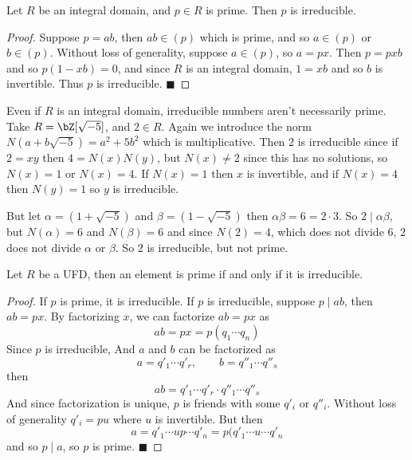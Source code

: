 \documentclass[10pt]{article}
\def\divides{{\mid}}
\def\qed{\hskip1cm\hbox{}\hfill$\blacksquare$}
\begin{document}
\begin{prop*}

    Let $R$ be an integral domain, and $p\in R$ is prime.
    Then $p$ is irreducible.

\end{prop*}

\begin{proof}

    Suppose $p=ab$, then $ab\in(p)$ which is prime, and so $a\in(p)$ or $b\in(p)$.
    Without loss of generality, suppose $a\in(p)$, so $a=px$.
    Then $p=pxb$ and so $p(1-xb)=0$, and since $R$ is an integral domain, $1=xb$ and so $b$ is invertible.
    Thus $p$ is irreducible.
    \qed

\end{proof}

\begin{exam*}

    Even if $R$ is an integral domain, irreducible numbers aren't necessarily prime.
    Take $R=\bZ[\sqrt{-5}]$, and $2\in R$.
    Again we introduce the norm $N(a+b\sqrt{-5})=a^2+5b^2$ which is multiplicative.
    Then $2$ is irreducible since if $2=xy$ then $4=N(x)N(y)$, but $N(x)\neq2$ since this has no solutions, so $N(x)=1$ or $N(x)=4$.
    If $N(x)=1$ then $x$ is invertible, and if $N(x)=4$ then $N(y)=1$ so $y$ is irreducible.

    But let $\alpha=(1+\sqrt{-5})$ and $\beta=(1-\sqrt{-5})$ then $\alpha\beta=6=2\cdot3$.
    So $2\divides\alpha\beta$, but $N(\alpha)=6$ and $N(\beta)=6$ and since $N(2)=4$, which does not divide $6$, $2$ does not divide $\alpha$ or $\beta$.
    So $2$ is irreducible, but not prime.

\end{exam*}

\begin{prop*}

    Let $R$ be a UFD, then an element is prime if and only if it is irreducible.

\end{prop*}

\begin{proof}

    If $p$ is prime, it is irreducible.
    If $p$ is irreducible, suppose $p\divides ab$, then $ab=px$.
    By factorizing $x$, we can factorize $ab=px$ as
    \[ ab = px = p(q_1\cdots q_n) \]
    Since $p$ is irreducible,
    And $a$ and $b$ can be factorized as
    \[ a = q'_1\cdots q'_r,\qquad b = q''_1\cdots q''_s \]
    then
    \[ ab = q'_1\cdots q'_r\cdot q''_1\cdots q''_s \]
    And since factorization is unique, $p$ is friends with some $q'_i$ or $q''_i$.
    Without loss of generality $q'_i=pu$ where $u$ is invertible.
    But then
    \[ a = q'_1\cdots up\cdots q'_n = p(q'_1\cdots u\cdots q'_n \]
    and so $p\divides a$, so $p$ is prime.
    \qed

\end{proof}
\end{document}
